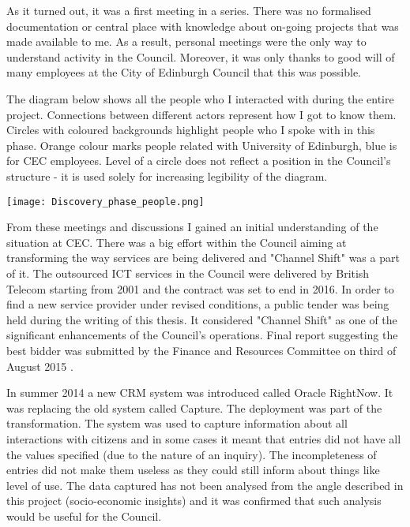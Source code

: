 As it turned out, it was a first meeting in a series. There was no formalised documentation or central place with knowledge about on-going projects that was made available to me. As a result, personal meetings were the only way to understand activity in the Council. Moreover, it was only thanks to good will of many employees at the City of Edinburgh Council that this was possible.

The diagram below shows all the people who I interacted with during the entire project. Connections between different actors represent how I got to know them. Circles with coloured backgrounds highlight people who I spoke with in this phase. Orange colour marks people related with University of Edinburgh, blue is for CEC employees. Level of a circle does not reflect a position in the Council's structure - it is used solely for increasing legibility of the diagram.

\begin{center}
  \texttt{[image: Discovery\_phase\_people.png]}
  \label{normal_case}
\end{center}


From these meetings and discussions I gained an initial understanding of the situation at CEC. There was a big effort within the Council aiming at transforming the way services are being delivered and "Channel Shift" was a part of it. The outsourced ICT services in the Council were delivered by British Telecom starting from 2001 and the contract was set to end in 2016. In order to find a new service provider under revised conditions, a public tender was being held during the writing of this thesis. It considered "Channel Shift" as one of the significant enhancements of the Council's operations. Final report suggesting the best bidder was submitted by the Finance and Resources Committee on third of August 2015 \citep{FinanceandResourcesCommittee2016}.

In summer 2014 a new CRM system was introduced called Oracle RightNow. It was replacing the old system called Capture. The deployment was part of the transformation. The system was used to capture information about all interactions with citizens and in some cases it meant that entries did not have all the values specified (due to the nature of an inquiry). The incompleteness of entries did not make them useless as they could still inform about things like level of use. The data captured has not been analysed from the angle described in this project (socio-economic insights) and it was confirmed that such analysis would be useful for the Council.

